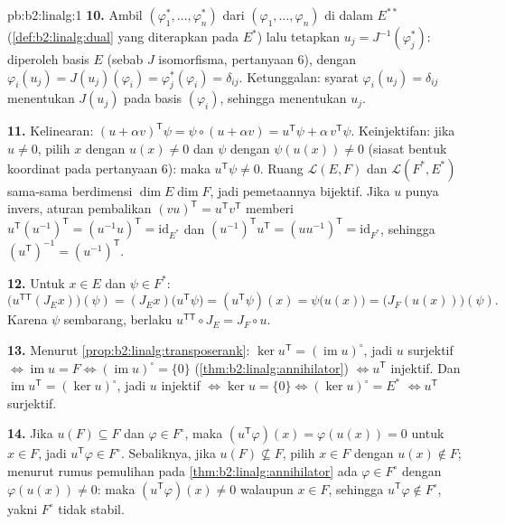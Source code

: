 \begin{solution}{pb:b2:linalg:1}
\textbf{10.} Ambil  $(\varphi_1^*, \dots,
\varphi_n^*)$ dari $(\varphi_1, \dots, \varphi_n)$ di dalam $E^{**}$
(\cref{def:b2:linalg:dual} yang diterapkan pada $E^*$) lalu tetapkan $u_j =
J^{-1}(\varphi_j^*)$: diperoleh basis $E$ (sebab $J$ isomorfisma,
pertanyaan 6), dengan $\varphi_i(u_j) = J(u_j)(\varphi_i) =
\varphi_j^*(\varphi_i) = \delta_{ij}$. Ketunggalan: syarat
$\varphi_i(u_j) = \delta_{ij}$ menentukan $J(u_j)$ pada basis
$(\varphi_i)$, sehingga menentukan $u_j$.

\textbf{11.} Kelinearan: $(u + \alpha v)^{\mathsf T}\psi = \psi
\circ (u + \alpha v) = u^{\mathsf T}\psi + \alpha\, v^{\mathsf
T}\psi$. Keinjektifan: jika $u \neq 0$, pilih $x$ dengan $u(x) \neq 0$
dan $\psi$ dengan $\psi(u(x)) \neq 0$ (siasat bentuk koordinat pada
pertanyaan 6): maka $u^{\mathsf T}\psi \neq 0$. Ruang $\mathcal{L}(E,F)$
dan $\mathcal{L}(F^*, E^*)$ sama-sama berdimensi $\dim E \dim F$, jadi
pemetaannya bijektif. Jika $u$ punya invers, aturan pembalikan
$(vu)^{\mathsf T} = u^{\mathsf T}v^{\mathsf T}$ memberi $u^{\mathsf
T}(u^{-1})^{\mathsf T} = (u^{-1}u)^{\mathsf T} =
\mathrm{id}_{E^*}$ dan $(u^{-1})^{\mathsf T}u^{\mathsf T} =
(uu^{-1})^{\mathsf T} = \mathrm{id}_{F^*}$, sehingga $(u^{\mathsf
T})^{-1} = (u^{-1})^{\mathsf T}$.

\textbf{12.} Untuk $x \in E$ dan $\psi \in F^*$:
\[
\bigl(u^{\mathsf T\mathsf T}(J_E x)\bigr)(\psi)
= (J_E x)\bigl(u^{\mathsf T}\psi\bigr)
= (u^{\mathsf T}\psi)(x)
= \psi\bigl(u(x)\bigr)
= \bigl(J_F(u(x))\bigr)(\psi).
\]
Karena $\psi$ sembarang, berlaku $u^{\mathsf T\mathsf T} \circ J_E = J_F
\circ u$.

\textbf{13.} Menurut \cref{prop:b2:linalg:transposerank}: $\ker
u^{\mathsf T} = (\operatorname{im} u)^\circ$, jadi $u$ surjektif
$\iff \operatorname{im} u = F \iff (\operatorname{im}u)^\circ =
\{0\}$ (\cref{thm:b2:linalg:annihilator}) $\iff u^{\mathsf T}$
injektif. Dan $\operatorname{im} u^{\mathsf T} = (\ker
u)^\circ$, jadi $u$ injektif $\iff \ker u = \{0\} \iff (\ker
u)^\circ = E^*$ $\iff u^{\mathsf T}$ surjektif.

\textbf{14.} Jika $u(F) \subseteq F$ dan $\varphi \in F^\circ$, maka
$(u^{\mathsf T}\varphi)(x) = \varphi(u(x)) = 0$ untuk $x \in F$, jadi
$u^{\mathsf T}\varphi \in F^\circ$. Sebaliknya, jika $u(F)
\not\subseteq F$, pilih $x \in F$ dengan $u(x) \notin F$; menurut
rumus pemulihan pada \cref{thm:b2:linalg:annihilator} ada
$\varphi \in F^\circ$ dengan $\varphi(u(x)) \neq 0$: maka
$(u^{\mathsf T}\varphi)(x) \neq 0$ walaupun $x \in F$, sehingga
$u^{\mathsf T}\varphi \notin F^\circ$, yakni $F^\circ$ tidak stabil.


\end{solution}
